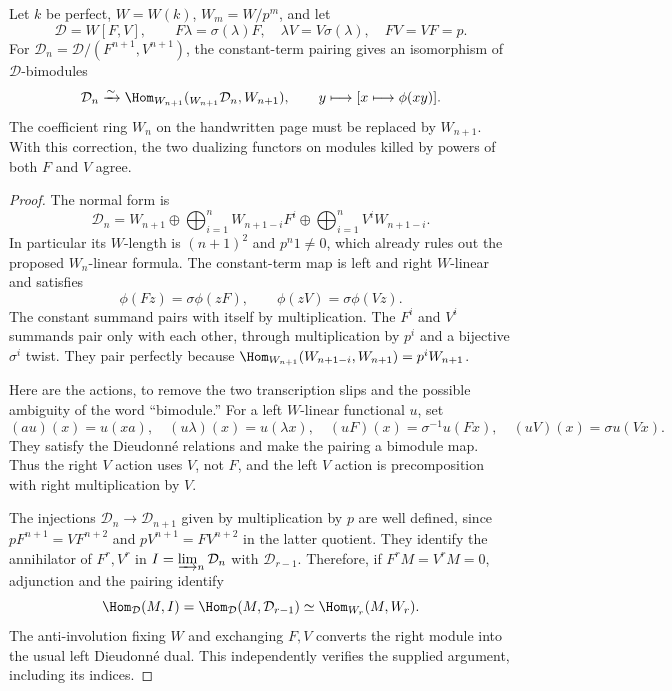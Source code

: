 \begin{proposition}[R8, scans 9:5--8]\label{prop:DE-R8}
Let $k$ be perfect, $W=W(k)$, $W_m=W/p^m$, and let
\[
 \mathcal D=W[F,V],\qquad F\lambda=\sigma(\lambda)F,\quad
 \lambda V=V\sigma(\lambda),\quad FV=VF=p.
\]
For $\mathcal D_n=\mathcal D/(F^{n+1},V^{n+1})$, the constant-term pairing gives an isomorphism of $\mathcal D$-bimodules
\[
 \mathcal D_n\xrightarrow{\sim}
 \Hom_{W_{n+1}}({}_{W_{n+1}}\mathcal D_n,W_{n+1}),\qquad
 y\longmapsto[x\longmapsto\phi(xy)].
\]
The coefficient ring $W_n$ on the handwritten page must be replaced by $W_{n+1}$.  With this correction, the two dualizing functors on modules killed by powers of both $F$ and $V$ agree.
\end{proposition}
\begin{proof}
The normal form is
\[
 \mathcal D_n=W_{n+1}\oplus
 \bigoplus_{i=1}^nW_{n+1-i}F^i\oplus
 \bigoplus_{i=1}^nV^iW_{n+1-i}.
\]
In particular its $W$-length is $(n+1)^2$ and $p^n1\ne0$, which already rules out the proposed $W_n$-linear formula.  The constant-term map is left and right $W$-linear and satisfies
\[
 \phi(Fz)=\sigma\phi(zF),\qquad
 \phi(zV)=\sigma\phi(Vz).
\]
The constant summand pairs with itself by multiplication.  The $F^i$ and $V^i$ summands pair only with each other, through multiplication by $p^i$ and a bijective $\sigma^i$ twist.  They pair perfectly because
$\Hom_{W_{n+1}}(W_{n+1-i},W_{n+1})=p^iW_{n+1}$.

Here are the actions, to remove the two transcription slips and the possible ambiguity of the word ``bimodule.''  For a left $W$-linear functional $u$, set
\[
 (a u)(x)=u(xa),\quad
 (u\lambda)(x)=u(\lambda x),\quad
 (uF)(x)=\sigma^{-1}u(Fx),\quad
 (uV)(x)=\sigma u(Vx).
\]
They satisfy the Dieudonn\'e relations and make the pairing a bimodule map.  Thus the right $V$ action uses $V$, not $F$, and the left $V$ action is precomposition with right multiplication by $V$.

The injections $\mathcal D_n\to\mathcal D_{n+1}$ given by multiplication by $p$ are well defined, since $pF^{n+1}=VF^{n+2}$ and $pV^{n+1}=FV^{n+2}$ in the latter quotient.  They identify the annihilator of $F^r,V^r$ in $I=\varinjlim_n\mathcal D_n$ with $\mathcal D_{r-1}$.  Therefore, if $F^rM=V^rM=0$, adjunction and the pairing identify
\[
 \Hom_{\mathcal D}(M,I)
 =\Hom_{\mathcal D}(M,\mathcal D_{r-1})
 \simeq\Hom_{W_r}(M,W_r).
\]
The anti-involution fixing $W$ and exchanging $F,V$ converts the right module into the usual left Dieudonn\'e dual.  This independently verifies the supplied argument, including its indices.
\end{proof}

